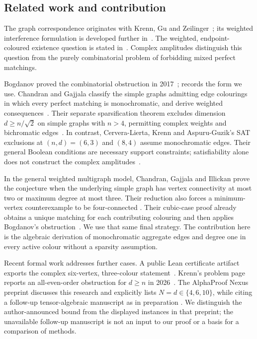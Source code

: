 \documentclass[11pt]{article}
\theoremstyle{definition}
\theoremstyle{plain}
\numberwithin{equation}{section}
\begin{document}
\subsection{Related work and contribution}

The graph correspondence originates with Krenn, Gu and Zeilinger~\cite{kgz};
its weighted interference formulation is developed further in~\cite{graphs2}.
The weighted, endpoint-coloured existence question is stated
in~\cite[Question~1]{kgs}. Complex amplitudes distinguish this question from
the purely combinatorial problem of forbidding mixed perfect matchings.

Bogdanov proved the combinatorial obstruction in 2017~\cite{bogdanov};
\cite[Theorem~7]{cgi} records the form we use. Chandran and Gajjala classify
the simple graphs admitting edge colourings in which every perfect matching
is monochromatic, and derive weighted consequences~\cite{cgclass}.
Their separate sparsification theorem excludes dimension
\(d\ge n/\sqrt2\) on simple graphs with \(n>4\), permitting complex
weights and bichromatic edges~\cite[Theorem~8]{cg}. In contrast,
Cervera-Lierta, Krenn and Aspuru-Guzik's SAT exclusions at \((n,d)=(6,3)\)
and \((8,4)\) assume monochromatic edges. Their general Boolean conditions
are necessary support constraints; satisfiability alone does not construct
the complex amplitudes~\cite[Sections~3.1--3.2]{logic}.

In the general weighted multigraph model, Chandran, Gajjala and Illickan
prove the conjecture when the underlying simple graph has vertex
connectivity at most two or maximum degree at most three. Their reduction
also forces a minimum-vertex counterexample to be four-connected
\cite[Theorems~9--11]{cgi}. Their cubic-case proof already obtains a unique
matching for each contributing colouring and then applies Bogdanov's
obstruction~\cite[Section~2.3, Corollary~17]{cgi}. We use that same final
strategy. The contribution here is the algebraic derivation of
monochromatic aggregate edges and degree one in every active colour
without a sparsity assumption.

Recent formal work addresses further cases. A public Lean certificate
artifact exports the complex six-vertex, three-colour statement~\cite{sixvertex}.
Krenn's problem page reports an all-even-order obstruction for \(d\ge n\)
in 2026~\cite{krennstatus}. The AlphaProof Nexus preprint discusses this
research and explicitly lists \(N=d\in\{4,6,10\}\), while citing a
follow-up tensor-algebraic manuscript as in preparation
\cite[Section~4 and reference~38]{nexus}. We distinguish the author-announced
bound from the displayed instances in that preprint; the unavailable
follow-up manuscript is not an input to our proof or a basis for a
comparison of methods.
\end{document}
